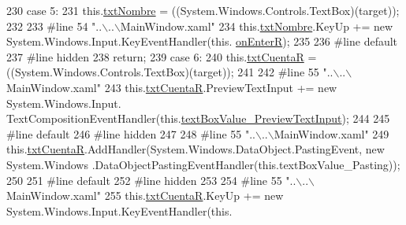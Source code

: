 \begin{DoxyCode}
230             \textcolor{keywordflow}{case} 5:
231             this.\hyperlink{class_asistencias__wpf_1_1_main_window_acd918b065d257146f683ff317be832a6}{txtNombre} = ((System.Windows.Controls.TextBox)(target));
232             
233 \textcolor{preprocessor}{            #line 54 "..\(\backslash\)..\(\backslash\)MainWindow.xaml"}
234 \textcolor{preprocessor}{}            this.\hyperlink{class_asistencias__wpf_1_1_main_window_acd918b065d257146f683ff317be832a6}{txtNombre}.KeyUp += \textcolor{keyword}{new} System.Windows.Input.KeyEventHandler(this.
      \hyperlink{class_asistencias__wpf_1_1_main_window_a021f286d29f89afb7e646c8a02fdcb4b}{onEnterR});
235             
236 \textcolor{preprocessor}{            #line default}
237 \textcolor{preprocessor}{}\textcolor{preprocessor}{            #line hidden}
238 \textcolor{preprocessor}{}            \textcolor{keywordflow}{return};
239             \textcolor{keywordflow}{case} 6:
240             this.\hyperlink{class_asistencias__wpf_1_1_main_window_a4ce5343faaf6dc02bc33f5da846cd4db}{txtCuentaR} = ((System.Windows.Controls.TextBox)(target));
241             
242 \textcolor{preprocessor}{            #line 55 "..\(\backslash\)..\(\backslash\)MainWindow.xaml"}
243 \textcolor{preprocessor}{}            this.\hyperlink{class_asistencias__wpf_1_1_main_window_a4ce5343faaf6dc02bc33f5da846cd4db}{txtCuentaR}.PreviewTextInput += \textcolor{keyword}{new} System.Windows.Input.
      TextCompositionEventHandler(this.\hyperlink{class_asistencias__wpf_1_1_main_window_a952d704cbea0440a9215abf74fe0ab17}{textBoxValue\_PreviewTextInput});
244             
245 \textcolor{preprocessor}{            #line default}
246 \textcolor{preprocessor}{}\textcolor{preprocessor}{            #line hidden}
247 \textcolor{preprocessor}{}            
248 \textcolor{preprocessor}{            #line 55 "..\(\backslash\)..\(\backslash\)MainWindow.xaml"}
249 \textcolor{preprocessor}{}            this.\hyperlink{class_asistencias__wpf_1_1_main_window_a4ce5343faaf6dc02bc33f5da846cd4db}{txtCuentaR}.AddHandler(System.Windows.DataObject.PastingEvent, \textcolor{keyword}{new} System.Windows
      .DataObjectPastingEventHandler(\textcolor{keyword}{this}.textBoxValue\_Pasting));
250             
251 \textcolor{preprocessor}{            #line default}
252 \textcolor{preprocessor}{}\textcolor{preprocessor}{            #line hidden}
253 \textcolor{preprocessor}{}            
254 \textcolor{preprocessor}{            #line 55 "..\(\backslash\)..\(\backslash\)MainWindow.xaml"}
255 \textcolor{preprocessor}{}            this.\hyperlink{class_asistencias__wpf_1_1_main_window_a4ce5343faaf6dc02bc33f5da846cd4db}{txtCuentaR}.KeyUp += \textcolor{keyword}{new} System.Windows.Input.KeyEventHandler(this.

\end{DoxyCode}
